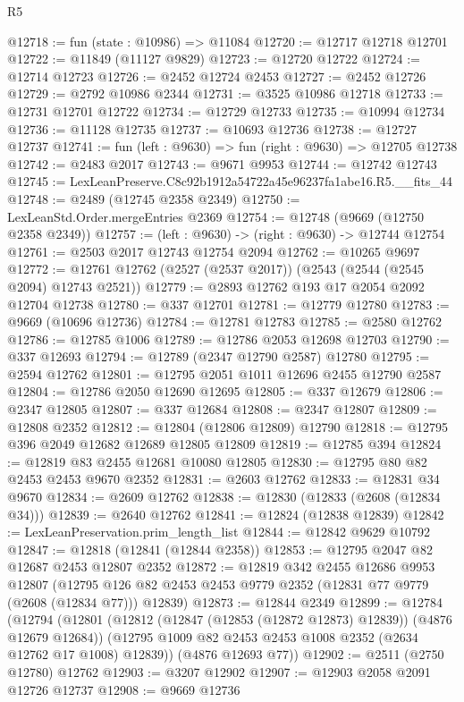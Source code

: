 \begin{lexlean}{R5}
\begin{coremodule}
@12718 := fun (state : @10986) => @11084
@12720 := @12717 @12718 @12701
@12722 := @11849 (@11127 @9829)
@12723 := @12720 @12722
@12724 := @12714 @12723
@12726 := @2452 @12724 @2453
@12727 := @2452 @12726
@12729 := @2792 @10986 @2344
@12731 := @3525 @10986 @12718
@12733 := @12731 @12701 @12722
@12734 := @12729 @12733
@12735 := @10994 @12734
@12736 := @11128 @12735
@12737 := @10693 @12736
@12738 := @12727 @12737
@12741 := fun (left : @9630) => fun (right : @9630) => @12705 @12738
@12742 := @2483 @2017
@12743 := @9671 @9953
@12744 := @12742 @12743
@12745 := LexLeanPreserve.C8c92b1912a54722a45e96237fa1abe16.R5.__fits_44
@12748 := @2489 (@12745 @2358 @2349)
@12750 := LexLeanStd.Order.mergeEntries @2369
@12754 := @12748 (@9669 (@12750 @2358 @2349))
@12757 := (left : @9630) -> (right : @9630) -> @12744 @12754
@12761 := @2503 @2017 @12743 @12754 @2094
@12762 := @10265 @9697
@12772 := @12761 @12762 (@2527 (@2537 @2017)) (@2543 (@2544 (@2545 @2094) @12743 @2521))
@12779 := @2893 @12762 @193 @17 @2054 @2092 @12704 @12738
@12780 := @337 @12701
@12781 := @12779 @12780
@12783 := @9669 (@10696 @12736)
@12784 := @12781 @12783
@12785 := @2580 @12762
@12786 := @12785 @1006
@12789 := @12786 @2053 @12698 @12703
@12790 := @337 @12693
@12794 := @12789 (@2347 @12790 @2587) @12780
@12795 := @2594 @12762
@12801 := @12795 @2051 @1011 @12696 @2455 @12790 @2587
@12804 := @12786 @2050 @12690 @12695
@12805 := @337 @12679
@12806 := @2347 @12805
@12807 := @337 @12684
@12808 := @2347 @12807
@12809 := @12808 @2352
@12812 := @12804 (@12806 @12809) @12790
@12818 := @12795 @396 @2049 @12682 @12689 @12805 @12809
@12819 := @12785 @394
@12824 := @12819 @83 @2455 @12681 @10080 @12805
@12830 := @12795 @80 @82 @2453 @2453 @9670 @2352
@12831 := @2603 @12762
@12833 := @12831 @34 @9670
@12834 := @2609 @12762
@12838 := @12830 (@12833 (@2608 (@12834 @34)))
@12839 := @2640 @12762
@12841 := @12824 (@12838 @12839)
@12842 := LexLeanPreservation.prim_length_list
@12844 := @12842 @9629 @10792
@12847 := @12818 (@12841 (@12844 @2358))
@12853 := @12795 @2047 @82 @12687 @2453 @12807 @2352
@12872 := @12819
    @342
    @2455
    @12686
    @9953
    @12807
    (@12795 @126 @82 @2453 @2453 @9779 @2352 (@12831 @77 @9779 (@2608 (@12834 @77))) @12839)
@12873 := @12844 @2349
@12899 := @12784
    (@12794
      (@12801
        (@12812 (@12847 (@12853 (@12872 @12873) @12839)) (@4876 @12679 @12684))
        (@12795 @1009 @82 @2453 @2453 @1008 @2352 (@2634 @12762 @17 @1008) @12839))
      (@4876 @12693 @77))
@12902 := @2511 (@2750 @12780) @12762
@12903 := @3207 @12902
@12907 := @12903 @2058 @2091 @12726 @12737
@12908 := @9669 @12736

\end{coremodule}
\end{lexlean}
